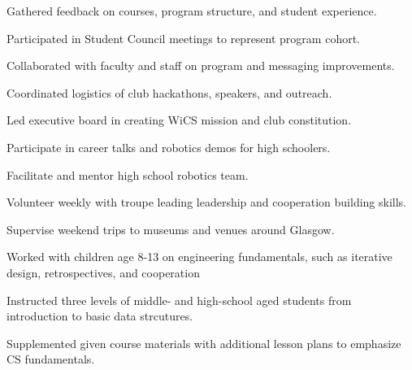 \documentclass[]{csaund_resume-openfont}
\begin{document}
\begin{tightemize}
\item Gathered feedback on courses, program structure, and student experience.
\item Participated in Student Council meetings to represent program cohort.
\item Collaborated with faculty and staff on program and messaging improvements.
\end{tightemize}
\sectionsep

\begin{tightemize}
\item Coordinated logistics of club hackathons, speakers, and outreach.
\item Led executive board in creating WiCS mission and club constitution.
\end{tightemize}
\sectionsep

\begin{tightemize}
\item Participate in career talks and robotics demos for high schoolers.
\item Facilitate and mentor high school robotics team.
\end{tightemize}
\sectionsep

\begin{tightemize}
\item Volunteer weekly with troupe leading leadership and cooperation building skills.
\item Supervise weekend trips to museums and venues around Glasgow.
\end{tightemize}
\sectionsep

\begin{tightemize}
\item Worked with children age 8-13 on engineering fundamentals, such as iterative design, retrospectives, and cooperation
\end{tightemize}
\sectionsep

\begin{tightemize}
\item Instructed three levels of middle- and high-school aged students from introduction to basic data strcutures. 
\item Supplemented given course materials with additional lesson plans to emphasize CS fundamentals.
\end{tightemize}
\sectionsep
\end{document}
